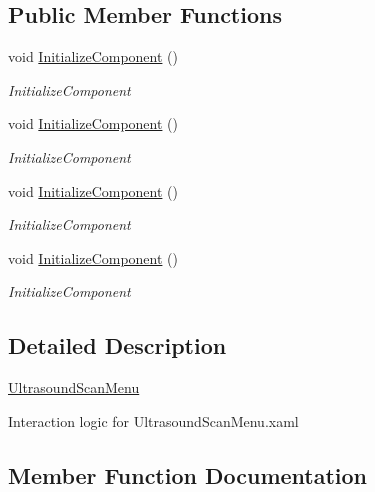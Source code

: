 \subsection*{Public Member Functions}
\begin{DoxyCompactItemize}
\item 
void \hyperlink{class_auto_sonography_w_p_f_1_1_ultrasound_scan_menu_a16a3c05a908d3edf244d0e5ec887519b}{Initialize\+Component} ()
\begin{DoxyCompactList}\small\item\em Initialize\+Component \end{DoxyCompactList}\item 
void \hyperlink{class_auto_sonography_w_p_f_1_1_ultrasound_scan_menu_a16a3c05a908d3edf244d0e5ec887519b}{Initialize\+Component} ()
\begin{DoxyCompactList}\small\item\em Initialize\+Component \end{DoxyCompactList}\item 
void \hyperlink{class_auto_sonography_w_p_f_1_1_ultrasound_scan_menu_a16a3c05a908d3edf244d0e5ec887519b}{Initialize\+Component} ()
\begin{DoxyCompactList}\small\item\em Initialize\+Component \end{DoxyCompactList}\item 
void \hyperlink{class_auto_sonography_w_p_f_1_1_ultrasound_scan_menu_a16a3c05a908d3edf244d0e5ec887519b}{Initialize\+Component} ()
\begin{DoxyCompactList}\small\item\em Initialize\+Component \end{DoxyCompactList}\end{DoxyCompactItemize}


\subsection{Detailed Description}
\hyperlink{class_auto_sonography_w_p_f_1_1_ultrasound_scan_menu}{Ultrasound\+Scan\+Menu} 

Interaction logic for Ultrasound\+Scan\+Menu.\+xaml 

\subsection{Member Function Documentation}
\hypertarget{class_auto_sonography_w_p_f_1_1_ultrasound_scan_menu_a16a3c05a908d3edf244d0e5ec887519b}{}\label{class_auto_sonography_w_p_f_1_1_ultrasound_scan_menu_a16a3c05a908d3edf244d0e5ec887519b} 
